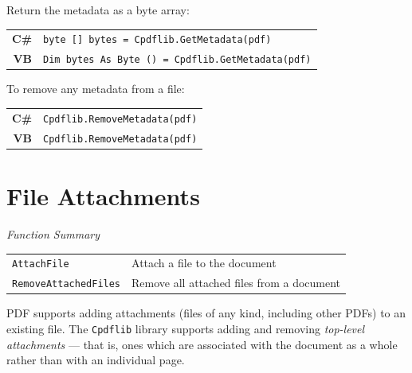 \documentclass[a4paper]{memoir}
\begin{document}
Return the metadata as a byte array:

\begin{framed}
\noindent\begin{tabular}{rl}
\small\sffamily\textbf{C\#} &
\begin{minipage}{4in}
\small\verb!byte [] bytes = Cpdflib.GetMetadata(pdf)!
\end{minipage}\\[5mm]
\small\sffamily\textbf{VB} &
\begin{minipage}{4in}
\small\verb!Dim bytes As Byte () = Cpdflib.GetMetadata(pdf)!
\end{minipage}\\[5mm]
\end{tabular}
\end{framed}


To remove any metadata from a file:

\begin{framed}
\noindent\begin{tabular}{rl}
\small\sffamily\textbf{C\#} &
\begin{minipage}{4in}
\small\verb!Cpdflib.RemoveMetadata(pdf)!
\end{minipage}\\[5mm]
\small\sffamily\textbf{VB} &
\begin{minipage}{4in}
\small\verb!Cpdflib.RemoveMetadata(pdf)!
\end{minipage}\\[5mm]
\end{tabular}
\end{framed}

\chapter{File Attachments}
\begin{framed}
\noindent\textit{Function Summary}\\[2mm]
\noindent\begin{tabular}{ll}
\verb!AttachFile! & Attach a file to the document\\
\verb!RemoveAttachedFiles! & Remove all attached files from a document
\end{tabular}
\end{framed}

PDF supports adding attachments (files of any kind, including other PDFs) to an
existing file. The \verb!Cpdflib! library supports adding and removing
\textit{top-level attachments} --- that is, ones which are associated with the
document as a whole rather than with an individual page.
\end{document}

